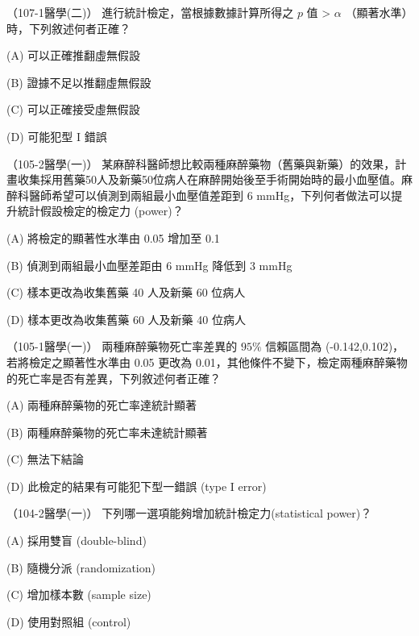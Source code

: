     \begin{docexam}{（107-1醫學(二)）}
        進行統計檢定，當根據數據計算所得之 $p$ 值 > $\alpha$ （顯著水準）時，下列敘述何者正確？

        (A) 可以正確推翻虛無假設

        (B) 證據不足以推翻虛無假設

        (C) 可以正確接受虛無假設

        (D) 可能犯型 I 錯誤
    \end{docexam}

    \begin{docexam}{（105-2醫學(一)）}
        某麻醉科醫師想比較兩種麻醉藥物（舊藥與新藥）的效果，計畫收集採用舊藥50人及新藥50位病人在麻醉開始後至手術開始時的最小血壓值。麻醉科醫師希望可以偵測到兩組最小血壓值差距到 6 mmHg，下列何者做法可以提升統計假設檢定的檢定力 (power)？

        (A) 將檢定的顯著性水準由 0.05 增加至 0.1

        (B) 偵測到兩組最小血壓差距由 6 mmHg 降低到 3 mmHg

        (C) 樣本更改為收集舊藥 40 人及新藥 60 位病人

        (D) 樣本更改為收集舊藥 60 人及新藥 40 位病人
    \end{docexam}
    
    \begin{docexam}{（105-1醫學(一)）}
        兩種麻醉藥物死亡率差異的 $95\%$ 信賴區間為 (-0.142,0.102)，若將檢定之顯著性水準由 0.05 更改為 0.01，其他條件不變下，檢定兩種麻醉藥物的死亡率是否有差異，下列敘述何者正確？

        (A) 兩種麻醉藥物的死亡率達統計顯著

        (B) 兩種麻醉藥物的死亡率未達統計顯著

        (C) 無法下結論

        (D) 此檢定的結果有可能犯下型一錯誤 (type I error)
    \end{docexam}
    
    \begin{docexam}{（104-2醫學(一)）}
        下列哪一選項能夠增加統計檢定力(statistical power)？

        (A) 採用雙盲 (double-blind)

        (B) 隨機分派 (randomization)

        (C) 增加樣本數 (sample size)

        (D) 使用對照組 (control)
    \end{docexam}

